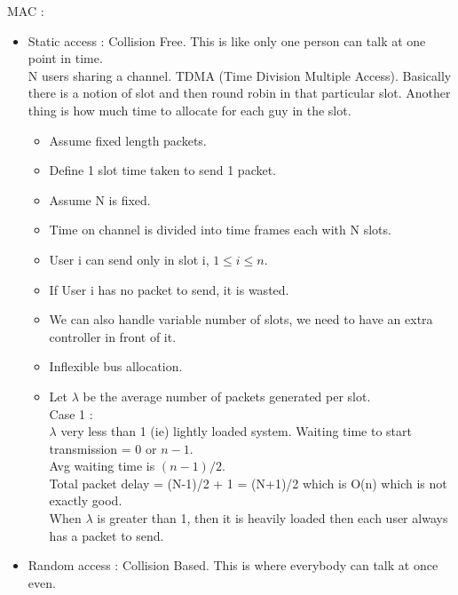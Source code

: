 \documentclass[solution,addpoints,12pt]{exam}
\begin{document}
MAC :\\
\begin{itemize}
\item Static access : Collision Free. This is like
only one person can talk at one point in time.\\

N users sharing a channel.
TDMA (Time Division Multiple Access). Basically
there is a notion of slot and then round robin
in that particular slot. Another thing is how
much time to allocate for each guy in the slot.\\

\begin{itemize}
\item Assume fixed length packets.
\item Define 1 slot time taken to send 1 packet.
\item Assume N is fixed.
\item Time on channel is divided into time frames each with N slots.
\item User i can send only in slot i, $1 \le i \le n$.
\item If User i has no packet to send, it is wasted.
\item We can also handle variable number of slots, we need
to have an extra controller in front of it.
\item Inflexible bus allocation.
\item Let $\lambda$ be the average number of packets generated
per slot.\\
Case 1 :\\
$\lambda$ very less than 1 (ie) lightly loaded system.
Waiting time to start transmission = 0 or $n-1$.\\
Avg waiting time is $(n-1)/2$.\\
Total packet delay = (N-1)/2 + 1 = (N+1)/2 which
is O(n) which is not exactly good.\\

When $\lambda$ is greater than 1, then it is heavily
loaded then each user always has a packet to send.

\end{itemize}
\item Random access : Collision Based. This is
where everybody can talk at once even.
\end{itemize}
\end{document}
